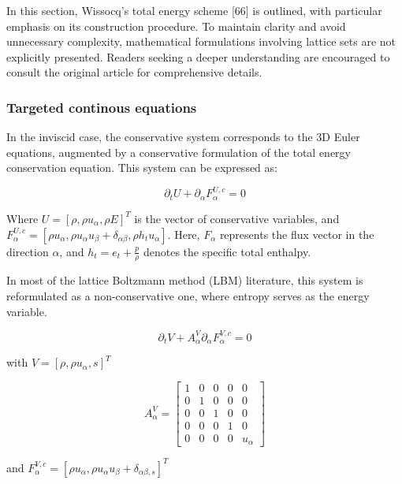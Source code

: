 In this section, Wissocq’s total energy scheme [66] is outlined, with particular
emphasis on its construction procedure. To maintain clarity and avoid
unnecessary complexity, mathematical formulations involving lattice sets are not
explicitly presented. Readers seeking a deeper understanding are encouraged to
consult the original article for comprehensive details.

\subsubsection{Targeted continous equations}

In the inviscid case, the conservative system corresponds to the 3D Euler
equations, augmented by a conservative formulation of the total energy
conservation equation. This system can be expressed as:

\begin{equation}
	\partial_t U + \partial_\alpha F_\alpha^{U,c} = 0
\end{equation}

Where \( U = [\rho, \rho u_\alpha, \rho E]^T \) is the vector of conservative
variables, and \( F_\alpha^{U,c} = [\rho u_\alpha, \rho u_\alpha u_\beta +
\delta_{\alpha\beta}, \rho h_t u_\alpha] \). Here, \( F_\alpha \) represents the
flux vector in the direction \(\alpha\), and \( h_t = e_t + \frac{p}{\rho} \)
denotes the specific total enthalpy.

In most of the lattice Boltzmann method (LBM) literature, this system is
reformulated as a non-conservative one, where entropy serves as the energy
variable. 


\begin{equation}
	\partial_t V + A_{\alpha}^V \partial_{\alpha}F_\alpha^{V,c} = 0
\end{equation}

with $V = [\rho, \rho u_\alpha, s]^T$


\begin{equation}
	A_{\alpha}^V = 
	\begin{bmatrix}
		1 & 0 & 0 & 0 & 0 \\
		0 & 1 & 0 & 0 & 0 \\
		0 & 0 & 1 & 0 & 0 \\
		0 & 0 & 0 & 1 & 0 \\
		0 & 0 & 0 & 0 & u_\alpha
		\end{bmatrix}
\end{equation}

and $F_\alpha^{V,c} = [\rho u_\alpha, \rho u_\alpha u_\beta +
\delta_{\alpha\beta, s}]^T$

